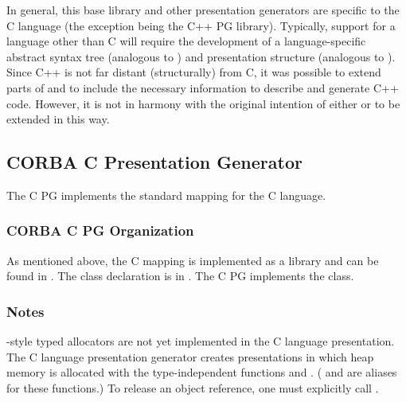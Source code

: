 In general, this base library and other presentation generators are specific to
the C language (the exception being the \CORBA{} C++ PG library).  Typically,
support for a language other than C will require the development of a
language-specific abstract syntax tree (analogous to \CAST{}) and presentation
structure (analogous to \PRESC{}).  Since C++ is not far distant (structurally)
from C, it was possible to extend parts of \CAST{} and \PRESC{} to include the
necessary information to describe and generate C++ code.  However, it is not in
harmony with the original intention of either \CAST{} or \PRESC{} to be
extended in this way.



\subsection{CORBA C Presentation Generator}
\label{subsec:PG:CORBA C Presentation Generator}

The \CORBA{} C PG implements the standard \CORBA{} mapping for the C language.

\subsubsection{CORBA C PG Organization}

As mentioned above, the \CORBA{} C mapping is implemented as a library and can
be found in .  The class declaration is in
.  The \CORBA{} C PG implements the
 class.

\subsubsection{Notes}


\CORBA{}-style typed allocators are not yet implemented in the \CORBA{} C
language presentation.  The \CORBA{} C language presentation generator creates
presentations in which heap memory is allocated with the type-independent
functions  and .
( and  are aliases for these
functions.)  To release an object reference, one must explicitly call
.



